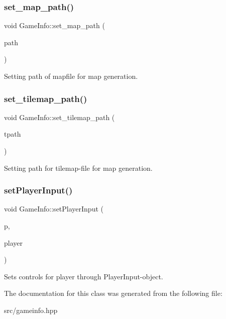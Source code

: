 \subsubsection{\texorpdfstring{set\+\_\+map\+\_\+path()}{set\_map\_path()}}
{\footnotesize\ttfamily void Game\+Info\+::set\+\_\+map\+\_\+path (\begin{DoxyParamCaption}\item[{std\+::string}]{path }\end{DoxyParamCaption})\hspace{0.3cm}{\ttfamily [inline]}}

Setting path of mapfile for map generation. \hypertarget{classGameInfo_aedb1dce53ebf765683a71d57b65c6cef}{}\label{classGameInfo_aedb1dce53ebf765683a71d57b65c6cef} 
\subsubsection{\texorpdfstring{set\+\_\+tilemap\+\_\+path()}{set\_tilemap\_path()}}
{\footnotesize\ttfamily void Game\+Info\+::set\+\_\+tilemap\+\_\+path (\begin{DoxyParamCaption}\item[{std\+::string}]{tpath }\end{DoxyParamCaption})\hspace{0.3cm}{\ttfamily [inline]}}

Setting path for tilemap-\/file for map generation. \hypertarget{classGameInfo_ae4d8a51be4f8d55b177e2fdadb5e4860}{}\label{classGameInfo_ae4d8a51be4f8d55b177e2fdadb5e4860} 
\subsubsection{\texorpdfstring{set\+Player\+Input()}{setPlayerInput()}}
{\footnotesize\ttfamily void Game\+Info\+::set\+Player\+Input (\begin{DoxyParamCaption}\item[{\hyperlink{classPlayerInput}{Player\+Input} const \&}]{p,  }\item[{int}]{player }\end{DoxyParamCaption})\hspace{0.3cm}{\ttfamily [inline]}}

Sets controls for player through Player\+Input-\/object. 

The documentation for this class was generated from the following file\+:\begin{DoxyCompactItemize}
\item 
src/gameinfo.\+hpp\end{DoxyCompactItemize}
